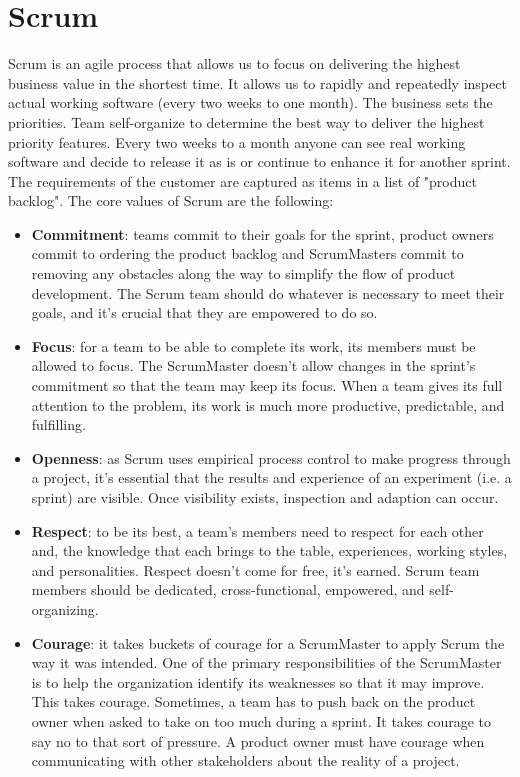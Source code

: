 \section{Scrum}
Scrum is an agile process that allows us to focus on delivering the highest business value in the shortest time.
It allows us to rapidly and repeatedly inspect actual working software (every two weeks to one month).
The business sets the priorities.
Team self-organize to determine the best way to deliver the highest priority features.
Every two weeks to a month anyone can see real working software and decide to release it as is or continue to enhance it for another sprint.
The requirements of the customer are captured as items in a list of "product backlog".
The core values of Scrum are the following:
\begin{itemize}
    \item \textbf{Commitment}: teams commit to their goals for the sprint, product owners commit to ordering the product backlog and ScrumMasters commit to removing any obstacles along the way to simplify the flow of product development. The Scrum team should do whatever is necessary to meet their goals, and it's crucial that they are empowered to do so.
    \item \textbf{Focus}: for a team to be able to complete its work, its members must be allowed to focus. The ScrumMaster doesn't allow changes in the sprint's commitment so that the team may keep its focus. When a team gives its full attention to the problem, its work is much more productive, predictable, and fulfilling.
    \item \textbf{Openness}: as Scrum uses empirical process control to make progress through a project, it's essential that the results and experience of an experiment (i.e. a sprint) are visible. Once visibility exists, inspection and adaption can occur.
    \item \textbf{Respect}: to be its best, a team's members need to respect for each other and, the knowledge that each brings to the table, experiences, working styles, and personalities. Respect doesn't come for free, it's earned. Scrum team members should be dedicated, cross-functional, empowered, and self-organizing.
    \item \textbf{Courage}: it takes buckets of courage for a ScrumMaster to apply Scrum the way it was intended. One of the primary responsibilities of the ScrumMaster is to help the organization identify its weaknesses so that it may improve. This takes courage. Sometimes, a team has to push back on the product owner when asked to take on too much during a sprint. It takes courage to say no to that sort of pressure. A product owner must have courage when communicating with other stakeholders about the reality of a project.
\end{itemize}

